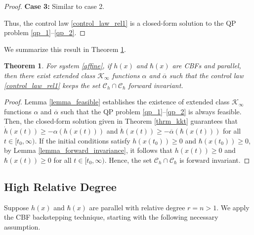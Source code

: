 \documentclass[letterpaper, 10 pt, conference]{ieeeconf}
\newtheorem{theorem}{Theorem}
\begin{document}
\begin{proof}
    \textbf{Case 3:} Similar to case 2.

    Thus, the control law \eqref{control_law_rel1} is a closed-form solution to the QP problem \eqref{qp_1}--\eqref{qp_2}.
\end{proof}

We summarize this result in Theorem \ref{thrm_rel1_Safe}.
\begin{theorem}\label{thrm_rel1_Safe}
    For system \eqref{affine}, if $h(x)$ and $\hbar(x)$ are CBFs and parallel, then there exist extended class $\mathcal{K}_\infty$ functions $\alpha$ and $\overline{\alpha}$ such that the control law \eqref{control_law_rel1} keeps the set $\mathcal{C}_h \cap \mathcal{C}_\hbar$ forward invariant.
\end{theorem}
\begin{proof}
    Lemma \ref{lemma_feasible} establishes the existence of extended class $\mathcal{K}_\infty$ functions $\alpha$ and $\overline{\alpha}$ such that the QP problem \eqref{qp_1}--\eqref{qp_2} is always feasible. Then, the closed-form solution given in Theorem \ref{thrm_kkt} guarantees that $\dot{h}(x(t)) \geq -\alpha(h(x(t)))$ and $ \dot{\hbar}(x(t)) \geq -\overline{\alpha}(\hbar(x(t)))$ for all $t \in [t_0, \infty)$. If the initial conditions satisfy $h(x(t_0)) \geq 0$ and $ \hbar(x(t_0)) \geq 0$, by Lemma \ref{lemma_forward_invariance}, it follows that $h(x(t)) \geq 0$ and $\hbar(x(t)) \geq 0$ for all $t \in [t_0, \infty)$. Hence, the set $\mathcal{C}_h \cap \mathcal{C}_\hbar$ is forward invariant.
\end{proof}

\subsection{High Relative Degree}

Suppose $h(x)$ and $\hbar(x)$ are parallel with relative degree $r = n > 1$. 
We apply the CBF backstepping technique, starting with the following necessary assumption.
\end{document}
